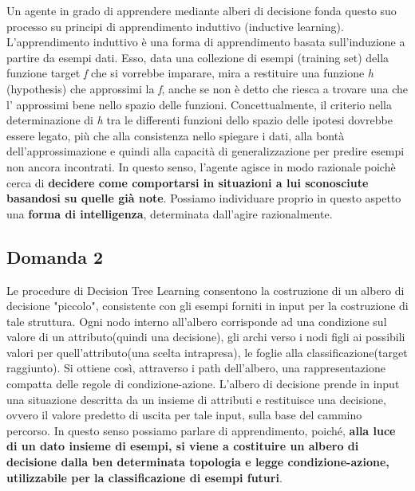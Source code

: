 			Un agente in grado di apprendere mediante alberi di decisione fonda questo suo processo su principi di apprendimento induttivo (\textsf{inductive learning}). L'apprendimento induttivo è una forma di apprendimento basata sull'induzione a partire da esempi dati. Esso, data una collezione di esempi (\textsf{training set}) della funzione \textsf{target} \emph{f} che si vorrebbe imparare, mira a restituire una funzione \emph{h} (\textsf{hypothesis}) che approssimi la \emph{f}, anche se non è detto che riesca a trovare una che l' approssimi bene nello spazio delle funzioni. Concettualmente, il criterio nella determinazione di \emph{h} tra le differenti funzioni dello spazio delle ipotesi dovrebbe essere legato, più che alla consistenza nello spiegare i dati, alla bontà dell'approssimazione e quindi alla capacità di generalizzazione per predire esempi non ancora incontrati. In questo senso, l'agente agisce in modo razionale poichè cerca di \textbf{decidere come comportarsi in situazioni a lui sconosciute basandosi su quelle già note}. Possiamo individuare proprio in questo aspetto una \textbf{forma di intelligenza}, determinata dall'agire razionalmente.
		\subsection{Domanda 2}
			Le procedure di \textsf{Decision Tree Learning} consentono la costruzione di un albero di decisione "piccolo", consistente con gli esempi forniti in input per la costruzione di tale struttura. Ogni nodo interno all'albero corrisponde ad una condizione sul valore di un attributo(quindi una decisione), gli archi verso i nodi figli ai possibili valori per quell'attributo(una scelta intrapresa), le foglie alla classificazione(target raggiunto). Si ottiene così, attraverso i \textsf{path} dell'albero, una rappresentazione compatta delle regole di condizione-azione. L'albero di decisione prende in input una situazione descritta da un insieme di attributi e restituisce una decisione, ovvero il valore predetto di uscita per tale input, sulla base del cammino percorso. In questo senso possiamo parlare di apprendimento, poiché, \textbf{alla luce di un dato insieme di esempi, si viene a costituire un albero di decisione dalla ben determinata topologia e legge condizione-azione, utilizzabile per la classificazione di esempi futuri}.
